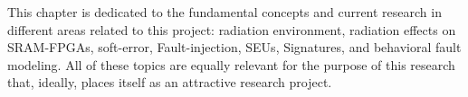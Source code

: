 

This chapter is dedicated to the fundamental concepts and current research in different areas related to this project: radiation environment, radiation effects on SRAM-FPGAs, soft-error, Fault-injection, SEUs, Signatures,  and behavioral fault modeling. All of these topics are equally relevant for the purpose of this research that, ideally, places itself as an attractive research project.








